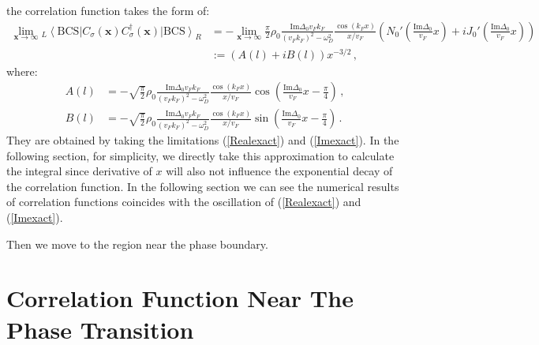 \documentclass[aps,onecolumn,nofootinbib,superscriptaddress,notitlepage,longbibliography]{revtex4-1}
\begin{document}
the correlation function takes the form of: 
\begin{align}
\lim_{\bm{x}\rightarrow\infty}{}_{L}\left\langle \text{BCS}\right|C_{\sigma}(\bm{x})C_{\sigma}^{\dagger}(\bm{x})\left|\text{BCS}\right\rangle _{R} & =-\lim_{\bm{x}\rightarrow\infty}\frac{\pi}{2}\rho_{0}\frac{\text{Im}\Delta_{0}v_{F}k_{F}}{(v_{F}k_{F})^{2}-\omega_{D}^{2}}\frac{\cos(k_{F}x)}{x/v_{F}}(N_{0}'(\frac{\text{Im}\Delta_{0}}{v_{F}}x)+iJ_{0}'(\frac{\text{Im}\Delta_{0}}{v_{F}}x))\nonumber \\
 & :=(A(l)+iB(l))x^{-3/2}\,,
\end{align}
where: 
\begin{align}
A(l) & =-\sqrt{\frac{\pi}{2}}\rho_{0}\frac{\text{Im}\Delta_{0}v_{F}k_{F}}{(v_{F}k_{F})^{2}-\omega_{D}^{2}}\frac{\cos(k_{F}x)}{x/v_{F}}\cos(\frac{\text{Im}\Delta_{0}}{v_{F}}x-\frac{\pi}{4})\,,\nonumber \\
B(l) & =-\sqrt{\frac{\pi}{2}}\rho_{0}\frac{\text{Im}\Delta_{0}v_{F}k_{F}}{(v_{F}k_{F})^{2}-\omega_{D}^{2}}\frac{\cos(k_{F}x)}{x/v_{F}}\sin(\frac{\text{Im}\Delta_{0}}{v_{F}}x-\frac{\pi}{4})\,.
\end{align}
They are obtained by taking the limitations (\ref{Realexact}) and
(\ref{Imexact}). In the following section, for simplicity, we directly
take this approximation to calculate the integral since derivative
of $x$ will also not influence the exponential decay of the correlation
function. In the following section we can see the numerical results
of correlation functions coincides with the oscillation of (\ref{Realexact})
and (\ref{Imexact}).

Then we move to the region near the phase boundary.

\section{Correlation Function Near The Phase Transition}
\end{document}
